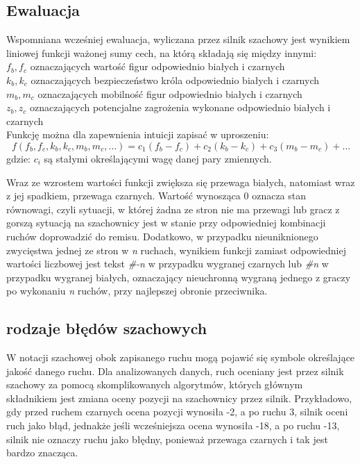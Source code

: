 \documentclass[inzynierska]{pwr_wmat_praca_dyplomowa}
\theoremstyle{plain}
\numberwithin{theorem}{chapter}
\theoremstyle{definition}
\numberwithin{theorem}{chapter}
\begin{document}
\subsection{Ewaluacja}
Wspomniana wcześniej ewaluacja, wyliczana przez silnik szachowy jest wynikiem liniowej funkcji 
ważonej sumy cech, na którą składają się między innymi:\\
$f_b,f_c$ oznaczających wartość figur odpowiednio białych i czarnych\\
$k_b,k_c$ oznaczających bezpieczeństwo króla odpowiednio białych i czarnych\\
$m_b,m_c$ oznaczających mobilność figur odpowiednio białych i czarnych\\
$z_b,z_c$ oznaczających potencjalne zagrożenia wykonane odpowiednio białych i czarnych\\


Funkcję można dla zapewnienia intuicji zapisać w uproszeniu:
\begin{equation}
	f(f_b,f_c,k_b,k_c,m_b,m_c,\dots)=c_1(f_b-f_c)+c_2(k_b-k_c)+c_3(m_b-m_c)+\dots
\end{equation}
gdzie:
$c_i$ są stałymi określającymi wagę danej pary zmiennych.

Wraz ze wzrostem wartości funkcji zwiększa się przewaga białych, natomiast wraz z jej spadkiem, przewaga czarnych. Wartość wynosząca 0 oznacza stan równowagi, czyli sytuacji, w której żadna ze stron nie ma przewagi lub gracz z gorszą sytuacją na szachownicy jest w stanie przy odpowiedniej kombinacji ruchów doprowadzić do remisu. Dodatkowo, w przypadku nieuniknionego zwycięstwa jednej ze stron w \textit{n} ruchach, wynikiem funkcji zamiast odpowiedniej wartości liczbowej jest tekst \textit{\#-n} w przypadku wygranej czarnych lub \textit{\#n} w przypadku wygranej białych, oznaczający nieuchronną wygraną jednego z graczy po wykonaniu \textit{n} ruchów, przy najlepszej obronie przeciwnika.


\subsection{rodzaje błędów szachowych} \label{sec:mysection}


W notacji szachowej obok zapisanego ruchu mogą pojawić się symbole określające jakość danego ruchu. Dla analizowanych danych, ruch oceniany jest przez silnik szachowy za pomocą skomplikowanych algorytmów, których głównym składnikiem jest zmiana oceny pozycji na szachownicy przez silnik.
Przykładowo, gdy przed ruchem czarnych ocena pozycji wynosiła -2, a po ruchu 3, silnik oceni ruch jako błąd, jednakże jeśli wcześniejsza ocena wynosiła -18, a po ruchu -13, silnik nie oznaczy ruchu jako błędny, ponieważ przewaga czarnych i tak jest bardzo znacząca.
\end{document}
